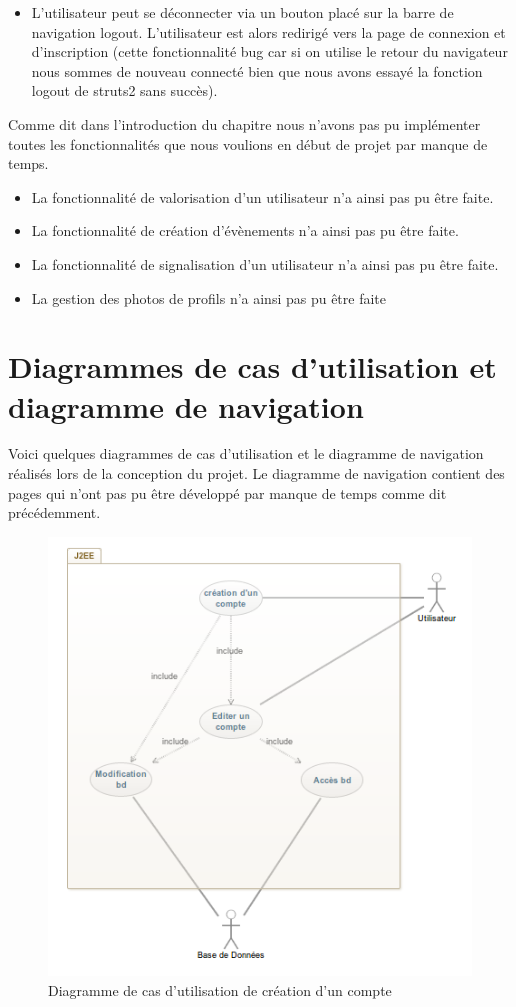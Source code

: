 \begin{itemize}
 \item L'utilisateur peut se déconnecter via un bouton placé sur la barre de navigation logout.
  L'utilisateur est alors redirigé vers la page de connexion et d'inscription (cette fonctionnalité bug car si on utilise le retour du navigateur nous sommes de nouveau connecté bien que nous avons essayé la fonction logout de struts2 sans succès).
\end{itemize}

Comme dit dans l'introduction du chapitre nous n'avons pas pu implémenter toutes les fonctionnalités que nous voulions en début de projet par manque de temps.
\begin{itemize}
\item La fonctionnalité de valorisation d'un utilisateur n'a ainsi pas pu être faite.
\item La fonctionnalité de création d'évènements n'a ainsi pas pu être faite.
\item La fonctionnalité de signalisation d'un utilisateur n'a ainsi pas pu être faite.
\item La gestion des photos de profils n'a ainsi pas pu être faite
\end{itemize}

\newpage
\section{Diagrammes de cas d'utilisation et diagramme de navigation}

Voici quelques diagrammes de cas d'utilisation et le diagramme de navigation réalisés lors de la conception du projet. Le diagramme de navigation contient des pages qui n'ont pas pu être développé par manque de temps comme dit précédemment.
\vfill
\begin{figure}[ht!]
  \centering
   \caption{Diagramme de cas d'utilisation de création d'un compte}
   \includegraphics[scale=0.7]{cuCC}
\end{figure}

